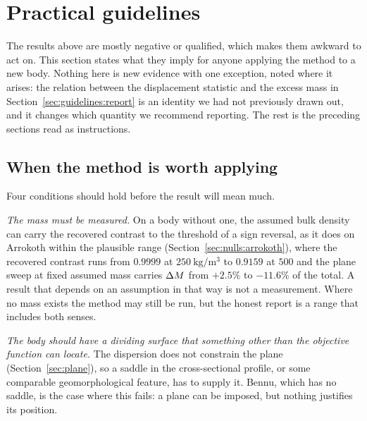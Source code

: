 \section{Practical guidelines}
\label{sec:guidelines}

The results above are mostly negative or qualified, which makes them
awkward to act on. This section states what they imply for anyone applying
the method to a new body. Nothing here is new evidence with one exception,
noted where it arises: the relation between the displacement statistic and
the excess mass in Section~\ref{sec:guidelines:report} is an identity we
had not previously drawn out, and it changes which quantity we recommend
reporting. The rest is the preceding sections read as instructions.

\subsection{When the method is worth applying}
\label{sec:guidelines:when}

Four conditions should hold before the result will mean much.

\emph{The mass must be measured.} On a body without one, the assumed bulk
density can carry the recovered contrast to the threshold of a sign
reversal, as it does on Arrokoth within the plausible range
(Section~\ref{sec:nulls:arrokoth}), where the recovered contrast runs from
$0.9999$ at $\SI{250}{\kilo\gram\per\cubic\metre}$ to $0.9159$ at $500$ and
the plane sweep at fixed assumed mass carries $\Delta M$ from $+2.5\%$ to
$-11.6\%$ of the total. A result that depends on an assumption in that way
is not a measurement. Where no mass exists the method may still be run, but
the honest report is a range that includes both senses.

\emph{The body should have a dividing surface that something other than the
objective function can locate.} The dispersion does not constrain the plane
(Section~\ref{sec:plane}), so a saddle in the cross-sectional profile, or
some comparable geomorphological feature, has to supply it. Bennu, which has
no saddle, is the case where this fails: a plane can be imposed, but nothing
justifies its position.

